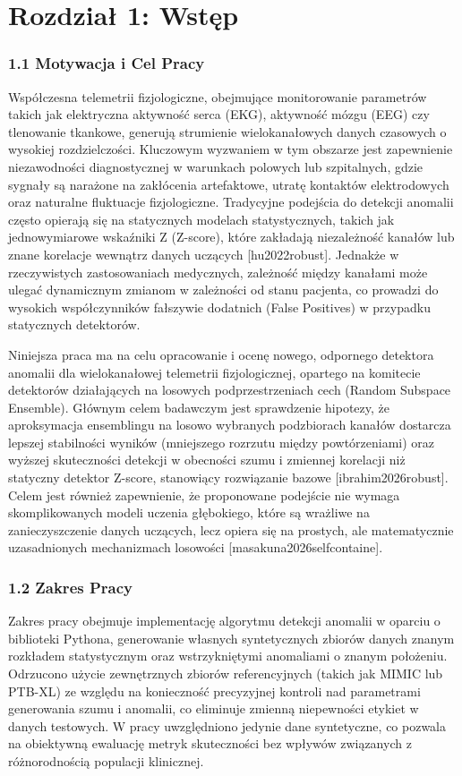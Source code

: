 \documentclass[W2, polski]{ThesisPLodz}
\begin{document}
\chapter{Rozdział 1: Wstęp}
\subsection{1.1 Motywacja i Cel Pracy}
Współczesna telemetrii fizjologiczne, obejmujące monitorowanie parametrów takich jak elektryczna aktywność serca (EKG), aktywność mózgu (EEG) czy tlenowanie tkankowe, generują strumienie wielokanałowych danych czasowych o wysokiej rozdzielczości. Kluczowym wyzwaniem w tym obszarze jest zapewnienie niezawodności diagnostycznej w warunkach polowych lub szpitalnych, gdzie sygnały są narażone na zakłócenia artefaktowe, utratę kontaktów elektrodowych oraz naturalne fluktuacje fizjologiczne. Tradycyjne podejścia do detekcji anomalii często opierają się na statycznych modelach statystycznych, takich jak jednowymiarowe wskaźniki Z (Z-score), które zakładają niezależność kanałów lub znane korelacje wewnątrz danych uczących [hu2022robust]. Jednakże w rzeczywistych zastosowaniach medycznych, zależność między kanałami może ulegać dynamicznym zmianom w zależności od stanu pacjenta, co prowadzi do wysokich współczynników fałszywie dodatnich (False Positives) w przypadku statycznych detektorów.

Niniejsza praca ma na celu opracowanie i ocenę nowego, odpornego detektora anomalii dla wielokanałowej telemetrii fizjologicznej, opartego na komitecie detektorów działających na losowych podprzestrzeniach cech (Random Subspace Ensemble). Głównym celem badawczym jest sprawdzenie hipotezy, że aproksymacja ensemblingu na losowo wybranych podzbiorach kanałów dostarcza lepszej stabilności wyników (mniejszego rozrzutu między powtórzeniami) oraz wyższej skuteczności detekcji w obecności szumu i zmiennej korelacji niż statyczny detektor Z-score, stanowiący rozwiązanie bazowe [ibrahim2026robust]. Celem jest również zapewnienie, że proponowane podejście nie wymaga skomplikowanych modeli uczenia głębokiego, które są wrażliwe na zanieczyszczenie danych uczących, lecz opiera się na prostych, ale matematycznie uzasadnionych mechanizmach losowości [masakuna2026selfcontaine].

\subsection{1.2 Zakres Pracy}
Zakres pracy obejmuje implementację algorytmu detekcji anomalii w oparciu o biblioteki Pythona, generowanie własnych syntetycznych zbiorów danych znanym rozkładem statystycznym oraz wstrzykniętymi anomaliami o znanym położeniu. Odrzucono użycie zewnętrznych zbiorów referencyjnych (takich jak MIMIC lub PTB-XL) ze względu na konieczność precyzyjnej kontroli nad parametrami generowania szumu i anomalii, co eliminuje zmienną niepewności etykiet w danych testowych. W pracy uwzględniono jedynie dane syntetyczne, co pozwala na obiektywną ewaluację metryk skuteczności bez wpływów związanych z różnorodnością populacji klinicznej.
\end{document}
